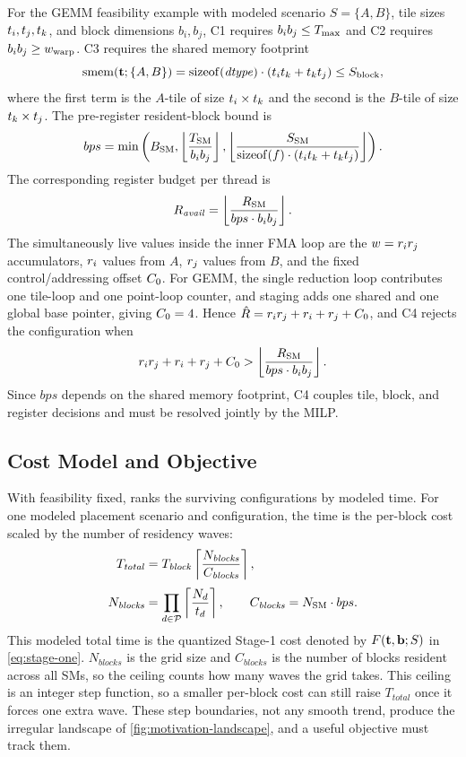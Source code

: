 For the GEMM feasibility example with modeled scenario \(S=\{A,B\}\), tile sizes
\(t_i,t_j,t_k\), and
block dimensions \(b_i,b_j\), C1 requires \(b_i b_j\le T_{\max}\) and C2
requires \(b_i b_j\ge w_{\mathrm{warp}}\). C3 requires the shared memory footprint
\[
\operatorname{smem}(\mathbf{t};\{A,B\}) =
\operatorname{sizeof}(\mathit{dtype})\cdot(t_it_k+t_kt_j)
\le S_{\mathrm{block}},
\]
where the first term is the \(A\)-tile of size \(t_i\times t_k\) and the
second is the \(B\)-tile of size \(t_k\times t_j\). The pre-register
resident-block bound is
\[
bps=\min\left(B_{\mathrm{SM}},
\left\lfloor \frac{T_{\mathrm{SM}}}{b_i b_j}\right\rfloor,
\left\lfloor
\frac{S_{\mathrm{SM}}}
{\operatorname{sizeof}(f)\cdot(t_it_k+t_kt_j)}
\right\rfloor\right).
\]
The corresponding register budget per thread is
\[
R_{\mathit{avail}}=\left\lfloor
\frac{R_{\mathrm{SM}}}{bps\cdot b_i b_j}\right\rfloor.
\]
The simultaneously live values inside the inner FMA loop are the \(w=r_ir_j\) accumulators, \(r_i\) values from \(A\), \(r_j\) values from \(B\), and the fixed control/addressing offset \(C_0\). For GEMM, the single reduction loop contributes one tile-loop and one point-loop counter, and staging adds one shared and one global base pointer, giving \(C_0=4\). Hence \(\hat{R}=r_ir_j+r_i+r_j+C_0\), and C4 rejects the configuration when
\[
r_ir_j+r_i+r_j+C_0 >
\left\lfloor \frac{R_{\mathrm{SM}}}{bps\cdot b_i b_j}\right\rfloor.
\]
Since \(bps\) depends on the shared memory footprint, C4 couples tile, block, and register decisions and must be resolved jointly by the MILP.

\subsection{Cost Model and Objective}
\label{sec:cost}
\label{sec:outer-product-optimality}
\label{sec:kernel-specialization}

With feasibility fixed, \name ranks the surviving configurations by modeled time. For one modeled placement scenario and configuration, the time is the per-block cost scaled by the number of residency waves:
\begin{equation}
\begin{aligned}
T_{\mathit{total}}
&=T_{\mathit{block}}
  \left\lceil\frac{N_{\mathit{blocks}}}{C_{\mathit{blocks}}}\right\rceil,\\[0.6ex]
N_{\mathit{blocks}}
&=\prod_{d\in\mathcal{P}}\left\lceil\frac{N_d}{t_d}\right\rceil,
\qquad C_{\mathit{blocks}}=N_{\mathrm{SM}}\cdot bps.
\end{aligned}
\label{eq:discrete-wave}
\end{equation}
This modeled total time is the quantized Stage-1 cost denoted by \(F(\mathbf{t},\mathbf{b};S)\) in \autoref{eq:stage-one}.
\(N_{\mathit{blocks}}\) is the grid size and \(C_{\mathit{blocks}}\) is the number of blocks resident across all SMs, so the ceiling counts how many waves the grid takes. This ceiling is an integer step function, so a smaller per-block cost can still raise \(T_{\mathit{total}}\) once it forces one extra wave. These step boundaries, not any smooth trend, produce the irregular landscape of \autoref{fig:motivation-landscape}, and a useful objective must track them.

